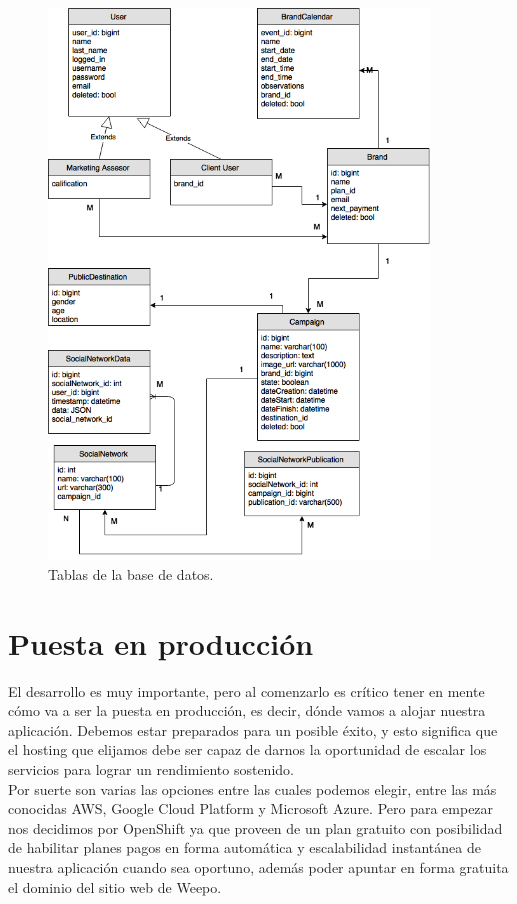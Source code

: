 \documentclass[oneside]{book}
\begin{document}
\begin{figure}[H]
	\centering
	\includegraphics[width=0.9\textwidth]{images/weepo-01.png}
	\medskip
	\caption{Tablas de la base de datos.}
	\medskip
\end{figure}	
	
\newpage


\section{Puesta en producción}

El desarrollo es muy importante, pero al comenzarlo es crítico tener en mente cómo va a ser la puesta en producción, es decir, dónde vamos a alojar nuestra aplicación. Debemos estar preparados para un posible éxito, y esto significa que el hosting que elijamos debe ser capaz de darnos la oportunidad de escalar los servicios para lograr un rendimiento sostenido.\\
Por suerte son varias las opciones entre las cuales podemos elegir, entre las más conocidas AWS, Google Cloud Platform y Microsoft Azure. Pero para empezar nos decidimos por OpenShift ya que proveen de un plan gratuito con posibilidad de habilitar planes pagos en forma automática y escalabilidad instantánea de nuestra aplicación cuando sea oportuno, además poder apuntar en forma gratuita el dominio del sitio web de Weepo.
\end{document}

